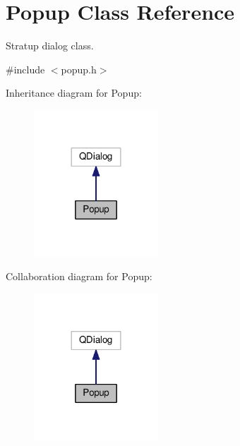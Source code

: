 \hypertarget{classPopup}{}\section{Popup Class Reference}
\label{classPopup}


Stratup dialog class.  




{\ttfamily \#include $<$popup.\+h$>$}



Inheritance diagram for Popup\+:\nopagebreak
\begin{figure}[H]
\begin{center}
\leavevmode
\includegraphics[width=132pt]{d3/dac/classPopup__inherit__graph}
\end{center}
\end{figure}


Collaboration diagram for Popup\+:\nopagebreak
\begin{figure}[H]
\begin{center}
\leavevmode
\includegraphics[width=132pt]{d2/dba/classPopup__coll__graph}
\end{center}
\end{figure}
